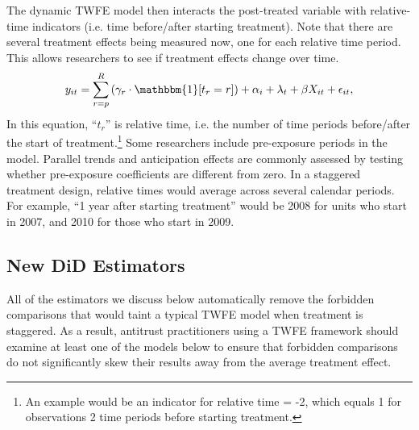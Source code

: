 \documentclass[12pt]{article}
\begin{document}
The dynamic TWFE model then interacts the post-treated variable with relative-time indicators (i.e. time before/after starting treatment). Note that there are several treatment effects being measured now, one for each relative time period. This allows researchers to see if treatment effects change over time.
\begin{equation}
    y_{it} = \sum_{r=p}^R\left(\gamma_r\cdot\mathbbm{1}[t_r=r]\right) + \alpha_i + \lambda_t + \beta X_{it} + \epsilon_{it},    
\end{equation}
In this equation, “$t_r$” is relative time, i.e. the number of time periods before/after the start of treatment.\footnote{An example would be an indicator for relative time = -2, which equals 1 for observations 2 time periods before starting treatment.} Some researchers include pre-exposure periods in the model.  Parallel trends and anticipation effects are commonly assessed by testing whether pre-exposure coefficients are different from zero. In a staggered treatment design, relative times would average across several calendar periods. For example, “1 year after starting treatment” would be 2008 for units who start in 2007, and 2010 for those who start in 2009.
\subsection{New DiD Estimators}
All of the estimators we discuss below automatically remove the forbidden comparisons that would taint a typical TWFE model when treatment is staggered. As a result, antitrust practitioners using a TWFE framework should examine at least one of the models below to ensure that forbidden comparisons do not significantly skew their results away from the average treatment effect.
\end{document}
